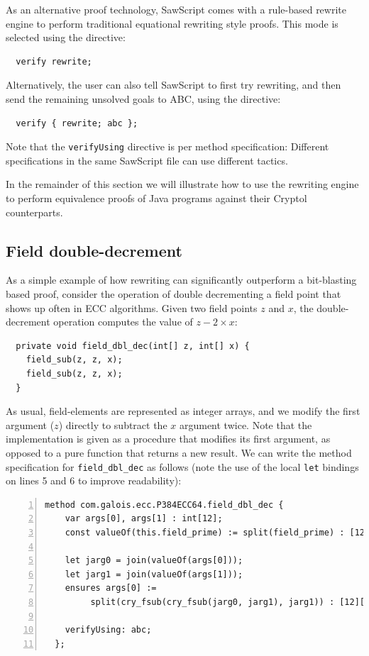\documentclass[12pt]{galois-whitepaper}
\newcommand{\sawScript}{{\sc SawScript}\xspace}
\begin{document}
As an alternative proof technology, \sawScript comes with a rule-based rewrite engine to perform
traditional equational rewriting style proofs. This mode is selected using the directive:
\begin{Verbatim}
  verify rewrite;
\end{Verbatim}
Alternatively, the user can also tell \sawScript to first try rewriting, and then send the remaining unsolved goals to ABC, using the directive:
\begin{Verbatim}
  verify { rewrite; abc };
\end{Verbatim}
Note that the {\tt verifyUsing} directive is per method specification: Different specifications in the same \sawScript file can use different tactics.

In the remainder of this section we will illustrate how to use the rewriting engine to perform equivalence proofs of Java programs against their
Cryptol counterparts.

\subsection{Field double-decrement}\label{sec:doubledec}
As a simple example of how rewriting can significantly outperform a bit-blasting based proof, consider the operation of double decrementing a
field point that shows up often in ECC algorithms.
Given two field points $z$ and $x$, the double-decrement operation computes the value of $z - 2\times x$:
\begin{Verbatim}
  private void field_dbl_dec(int[] z, int[] x) {
    field_sub(z, z, x);
    field_sub(z, z, x);
  }
\end{Verbatim}
As usual, field-elements are represented as integer arrays, and we modify the first argument ($z$) directly to subtract the $x$ argument twice.
Note that the implementation is given as a procedure that modifies its first argument, as opposed to a pure function that returns a new result.
We can write the method specification for {\tt field\_dbl\_dec} as follows (note the use of the local {\tt let} bindings on lines 5 and 6 to improve readability):

\begin{Verbatim}[numbers=left]
  method com.galois.ecc.P384ECC64.field_dbl_dec {
    var args[0], args[1] : int[12];
    const valueOf(this.field_prime) := split(field_prime) : [12][32];
  
    let jarg0 = join(valueOf(args[0]));
    let jarg1 = join(valueOf(args[1]));
    ensures args[0] :=
         split(cry_fsub(cry_fsub(jarg0, jarg1), jarg1)) : [12][32];

    verifyUsing: abc;
  };
\end{Verbatim}
\end{document}
